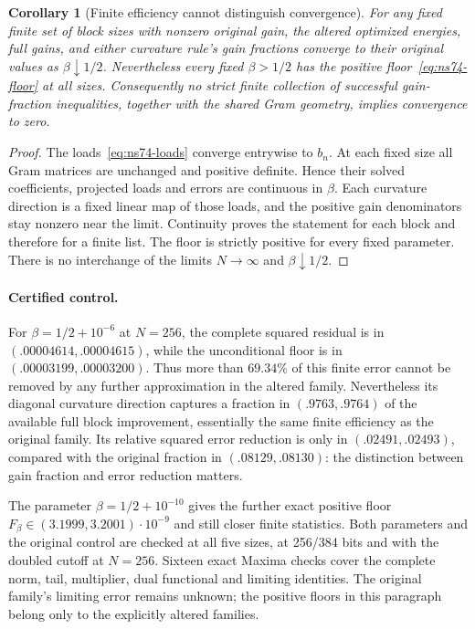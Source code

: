 \documentclass[11pt]{article}
\newtheorem{corollary}[theorem]{Corollary}
\theoremstyle{remark}
\begin{document}
\begin{corollary}[Finite efficiency cannot distinguish convergence]
\label{cor:ns74-finite-indistinguishability}
For any fixed finite set of block sizes with nonzero original gain,
the altered optimized energies, full gains, and either curvature
rule's gain fractions converge to their original values as
$\beta\downarrow1/2$. Nevertheless every fixed $\beta>1/2$ has the
positive floor~\eqref{eq:ns74-floor} at all sizes. Consequently no
strict finite collection of successful gain-fraction inequalities,
together with the shared Gram geometry, implies convergence to zero.
\end{corollary}
\begin{proof}
The loads~\eqref{eq:ns74-loads} converge entrywise to $b_n$.
At each fixed size all Gram matrices are unchanged and positive
definite. Hence their solved coefficients, projected loads and errors
are continuous in $\beta$. Each curvature direction is a fixed linear
map of those loads, and the positive gain denominators stay nonzero
near the limit. Continuity proves the statement for each block and
therefore for a finite list. The floor is strictly positive for every
fixed parameter. There is no interchange of the limits $N\to\infty$
and $\beta\downarrow1/2$.
\end{proof}

\paragraph{Certified control.}
For $\beta=1/2+10^{-6}$ at $N=256$, the complete squared residual is
in $(.00004614,.00004615)$, while the unconditional floor is in
$(.00003199,.00003200)$. Thus more than $69.34\%$ of this finite error
cannot be removed by any further approximation in the altered family.
Nevertheless its diagonal curvature direction captures a fraction in
$(.9763,.9764)$ of the available full block improvement, essentially
the same finite efficiency as the original family. Its relative squared
error reduction is only in $(.02491,.02493)$, compared with the original
fraction in $(.08129,.08130)$: the distinction between gain fraction and
error reduction matters.

The parameter $\beta=1/2+10^{-10}$ gives the further exact positive floor
$F_\beta\in(3.1999,3.2001)\cdot10^{-9}$ and still closer finite statistics.
Both parameters and the original control are checked at all five sizes,
at 256/384 bits and with the doubled cutoff at $N=256$. Sixteen exact
Maxima checks cover the complete norm, tail, multiplier, dual functional
and limiting identities. The original family's limiting error remains
unknown; the positive floors in this paragraph belong only to the
explicitly altered families.
\end{document}
